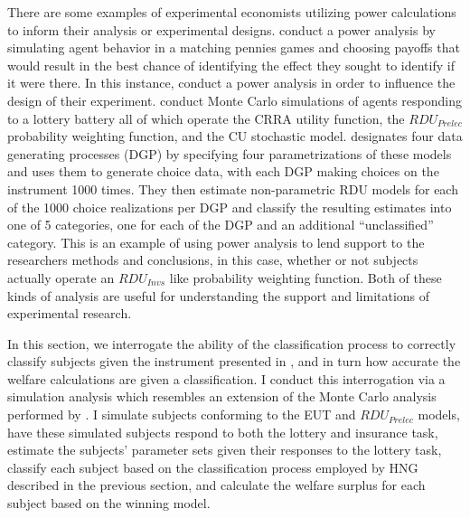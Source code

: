\documentclass[../main.tex]{subfiles}
\begin{document}
There are some examples of experimental economists utilizing power calculations to inform their analysis or experimental designs.
\textcite{Rutstrom2009} conduct a power analysis by simulating agent behavior in a matching pennies games and choosing payoffs that would result in the best chance of identifying the effect they sought to identify if it were there.
In this instance, \textcite{Rutstrom2009} conduct a power analysis in order to influence the design of their experiment.
\textcite[8]{Wilcox2015} conduct Monte Carlo simulations of agents responding to a lottery battery all of which operate the CRRA utility function, the $\mathit{RDU_{Prelec}}$ probability weighting function, and the CU stochastic model.
\textcite{Wilcox2015} designates four data generating processes (DGP) by specifying four parametrizations of these models and uses them to generate choice data, with each DGP making choices on the instrument 1000 times.
They then estimate non-parametric RDU models for each of the 1000 choice realizations per DGP and classify the resulting estimates into one of 5 categories, one for each of the DGP and an additional \enquote{unclassified} category.
This is an example of using power analysis to lend support to the researchers methods and conclusions, in this case, whether or not subjects actually operate an $\mathit{RDU_{Invs}}$ like probability weighting function.
Both of these kinds of analysis are useful for understanding the support and limitations of experimental research.

In this section, we interrogate the ability of the classification process to correctly classify subjects given the instrument presented in \textcite{Harrison2016}, and in turn how accurate the welfare calculations are given a classification.
I conduct this interrogation via a simulation analysis which resembles an extension of the Monte Carlo analysis performed by \textcite{Wilcox2015}.
I simulate subjects conforming to the EUT and $\mathit{RDU_{Prelec}}$ models, have these simulated subjects respond to both the lottery and insurance task, estimate the subjects' parameter sets given their responses to the lottery task, classify each subject based on the classification process employed by HNG described in the previous section, and calculate the welfare surplus for each subject based on the winning model.{\footnotemark}

\addtocounter{footnote}{-1}
\end{document}
